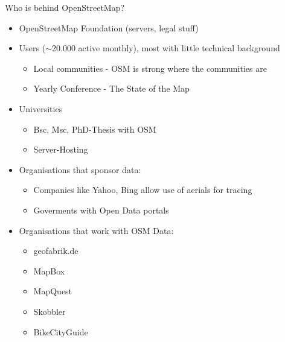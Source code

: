 \documentclass{beamer}
\begin{document}
\begin{frame}{Who is behind OpenStreetMap?}
  \begin{itemize}
    \item OpenStreetMap Foundation (servers, legal stuff)
      \pause
    \item Users ($\sim$20.000 active monthly), most with little technical background
    \begin{itemize}
      \item Local communities - OSM is strong where the communities are
      \item Yearly Conference - The State of the Map
    \end{itemize}
      \pause
    \item Universities
    \begin{itemize}
      \item Bsc, Msc, PhD-Thesis with OSM
      \item Server-Hosting
    \end{itemize}
      \pause
    \item Organisations that sponsor data:
    \begin{itemize}
      \item Companies like Yahoo, Bing allow use of aerials for tracing
      \item Goverments with Open Data portals
    \end{itemize}
      \pause
    \item Organisations that work with OSM Data:
    \begin{itemize}
      \item geofabrik.de
      \item MapBox
      \item MapQuest
      \item Skobbler
      \item BikeCityGuide
    \end{itemize}
  \end{itemize}

\end{frame}
\end{document}
